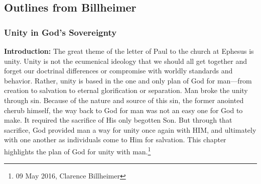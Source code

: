 \subsection{Outlines from Billheimer}


\subsubsection{Unity in God's Sovereignty}
\textbf{Introduction:} The great theme of the letter of Paul to the church at Ephesus is unity. Unity is not the ecumenical ideology that we should all get together and forget our doctrinal differences or compromise with worldly standards and behavior. Rather, unity is based in the one and only plan of God for man—from creation to salvation to eternal glorification or separation. Man broke the unity through sin. Because of the nature and source of this sin, the former anointed cherub himself, the way back to God for man was not an easy one for God to make. It required the sacrifice of His only begotten Son. But through that sacrifice, God provided man a way for unity once again with HIM, and ultimately with one another as individuals come to Him for salvation. This chapter highlights the plan of God for unity with man.\footnote{09 May 2016, Clarence Billheimer}

